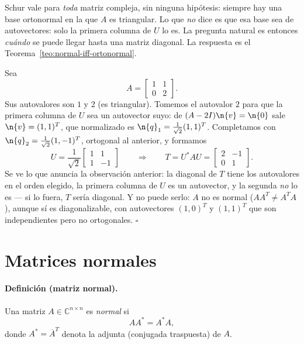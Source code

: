 \begin{remark}  %
Schur vale para \emph{toda} matriz compleja, sin ninguna hipótesis: siempre hay
una base ortonormal en la que $A$ es triangular. Lo que \emph{no} dice es que esa base
sea de autovectores: solo la primera columna de $U$ lo es. La pregunta natural
es entonces \emph{cuándo} se puede llegar hasta una matriz diagonal. La respuesta es
el Teorema~\ref{teo:normal-iff-ortonormal}.
\end{remark}

\begin{example}\label{ej:schur-numerico}
Sea
\[
A=\begin{bmatrix}1&1\\ 0&2\end{bmatrix}.
\]
Sus autovalores son $1$ y $2$ (es triangular). Tomemos el autovalor $2$ para que la
primera columna de $U$ sea un autovector suyo: de $(A-2I)\n{v}=\n{0}$ sale
$\n{v}=(1,1)^{T}$, que normalizado es $\n{q}_1=\tfrac1{\sqrt2}(1,1)^{T}$. Completamos con
$\n{q}_2=\tfrac1{\sqrt2}(1,-1)^{T}$, ortogonal al anterior, y formamos
\[
U=\frac{1}{\sqrt2}\begin{bmatrix}1&1\\ 1&-1\end{bmatrix}
\qquad\Longrightarrow\qquad
T=U^{*}AU=\begin{bmatrix}2&-1\\ 0&1\end{bmatrix}.
\]
Se ve lo que anuncia la observación anterior: la diagonal de $T$ tiene los autovalores en
el orden elegido, la primera columna de $U$ es un autovector, y la segunda \emph{no} lo es
--- si lo fuera, $T$ sería diagonal. Y no puede serlo: $A$ no es normal
($AA^{T}\neq A^{T}A$), aunque sí es diagonalizable, con autovectores $(1,0)^T$ y
$(1,1)^T$ que son independientes pero no ortogonales. \hfill$\square$
\end{example}

\section{Matrices normales}\label{sec:normales}

\paragraph{Definición (matriz normal).}
Una matriz \(A\in\mathbb{C}^{n\times n}\) es \emph{normal} si
\[
A A^{*}=A^{*}A,
\]
donde \(A^{*}=\overline{A}^{T}\) denota la adjunta (conjugada traspuesta) de \(A\).

